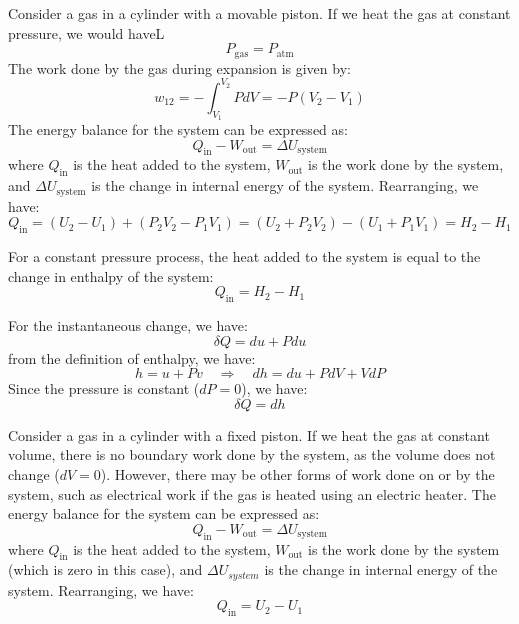 \documentclass[11pt]{report}
\begin{document}
\begin{example}
    Consider a gas in a cylinder with a movable piston. If we heat the gas at constant pressure, we would haveL
    $$
        P_{\text{gas}} = P_{\text{atm}}
    $$
    The work done by the gas during expansion is given by:
    $$
        w_{12} = -\int_{V_1}^{V_2} P dV = -P (V_2 - V_1)
    $$
    The energy balance for the system can be expressed as:
    $$
        Q_{\text{in}} - W_{\text{out}} = \Delta U_{\text{system}}
    $$
    where $Q_{\text{in}}$ is the heat added to the system, $W_{\text{out}}$ is the work done by the system, and $\Delta U_{\text{system}}$ is the change in internal energy of the system. Rearranging, we have:
    $$
        Q_{\text{in}} = (U_2 - U_1) + (P_2 V_2 - P_1 V_1) = (U_2 + P_2 V_2) - (U_1 + P_1 V_1) = H_2 - H_1
    $$
\end{example}

\begin{theorem}
    For a constant pressure process, the heat added to the system is equal to the change in enthalpy of the system:
    \begin{equation}
        Q_{\text{in}} = H_2 - H_1
    \end{equation}

    For the instantaneous change, we have:
    $$
        \delta Q = du + Pdu
    $$
    from the definition of enthalpy, we have:
    $$
        h = u + Pv \quad \Rightarrow \quad dh = du + PdV + VdP
    $$
    Since the pressure is constant ($dP = 0$), we have:
    $$
        \delta Q = dh
    $$
\end{theorem}

\begin{example}
    Consider a gas in a cylinder with a fixed piston. If we heat the gas at constant volume, there is no boundary work done by the system, as the volume does not change ($dV = 0$). However, there may be other forms of work done on or by the system, such as electrical work if the gas is heated using an electric heater. The energy balance for the system can be expressed as:
    $$
        Q_{\text{in}} - W_{\text{out}} = \Delta U_{\text{system}}
    $$
    where $Q_{\text{in}}$ is the heat added to the system, $W_{\text{out}}$ is the work done by the system (which is zero in this case), and $\Delta U_{system}$ is the change in internal energy of the system. Rearranging, we have:
    $$
        Q_{\text{in}} = U_2 - U_1
    $$
\end{example}
\end{document}
